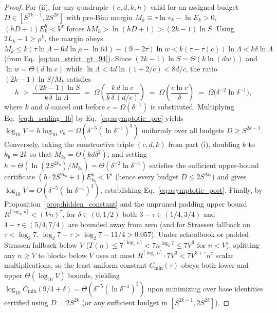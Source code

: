 \documentclass[11pt,a4paper]{article}
\theoremstyle{plain}
\theoremstyle{definition}
\theoremstyle{remark}
\begin{document}
\begin{proof}
For (ii), for any quadruple $(c, d, k, h)$ valid for an assigned budget $D \in [S^{2k-1}, 2 S^{2k}]$ with pre-Bini margin $M_k \equiv \tau\ln v_k - \ln E_k > 0$, $(h D + 1) E_k^h < V^\tau$ forces $h M_k > \ln(h D + 1) > (2k - 1)\ln S$. Using $2 L_k - 1 \ge \rho^k$, the margin obeys $M_k \le k(\tau\ln\Lambda - 6d\ln\rho - \ln 64) - (9 - 2\tau)\ln w < k(\tau - \tau(c))\ln\Lambda < k\delta\ln\Lambda$ (from Eq.~\eqref{eq:tau_strict_gt_94}). Since $(2k - 1)\ln S = \Theta(k\ln(dw))$ and $\ln w = \Theta(d\ln c)$ while $\ln\Lambda < 4d\ln(1 + 2/c) < 8d/c$, the ratio $(2k - 1)\ln S / M_k$ satisfies
\begin{equation}
    h \;>\; \frac{(2k - 1)\ln S}{k\,\delta\,\ln\Lambda} \;=\; \Omega\!\left(\frac{k\,d\ln c}{k\,\delta\,(d/c)}\right) \;=\; \Omega\!\left(\frac{c\ln c}{\delta}\right) \;=\; \Omega\!\bigl(\delta^{-2}\ln\delta^{-1}\bigr) ,
    \label{eq:h_scaling_lb}
\end{equation}
where $k$ and $d$ cancel out before $c = \Omega(\delta^{-1})$ is substituted. Multiplying Eq.~\eqref{eq:h_scaling_lb} by Eq.~\eqref{eq:asymptotic_pre} yields $\log_{10} V = h\log_{10} v_k = \Omega(\delta^{-5}(\ln\delta^{-1})^3)$ uniformly over all budgets $D \ge S^{2k-1}$. Conversely, taking the constructive triple $(c, d, k)$ from part (i), doubling $k$ to $k_b = 2k$ so that $M_{k_b} = \Theta(k d \delta^2)$, and setting $h = \Theta(\ln(2 S^{2 k_b}) / M_{k_b}) = \Theta(\delta^{-2}\ln\delta^{-1})$ satisfies the sufficient upper-bound certificate $(h \cdot 2 S^{2 k_b} + 1) E_{k_b}^h < V^\tau$ (hence every budget $D \le 2 S^{2 k_b}$) and gives $\log_{10} V = O(\delta^{-5}(\ln\delta^{-1})^3)$, establishing Eq.~\eqref{eq:asymptotic_post}. Finally, by Proposition~\ref{prop:hidden_constant} and the unpruned padding upper bound $R^{\lceil \log_V n\rceil} < (Vn)^\tau$, for $\delta \in (0, 1/2)$ both $3 - \tau \in (1/4, 3/4)$ and $4 - \tau \in (5/4, 7/4)$ are bounded away from zero (and for Strassen fallback on $\tau < \log_2 7$, $\log_2 7 - \tau > \log_2 7 - 11/4 > 0.057$). Under schoolbook or padded Strassen fallback below $V$ ($T(n) \le 7^{\lceil \log_2 n\rceil} < 7 n^{\log_2 7} \le 7 V^3$ for $n < V$), splitting any $n \ge V$ to blocks below $V$ uses at most $R^{\lceil \log_V n\rceil} \cdot 7 V^3 < 7 V^{3 + \tau} n^\tau$ scalar multiplications, so the least uniform constant $C_{\min}(\tau)$ obeys both lower and upper $\Theta(\log_{10} V)$ bounds, yielding $\log_{10} C_{\min}(9/4 + \delta) = \Theta(\delta^{-5}(\ln\delta^{-1})^3)$ upon minimizing over base identities certified using $D = 2 S^{2k}$ (or any sufficient budget in $[S^{2k-1}, 2 S^{2k}]$).
\end{proof}
\end{document}
